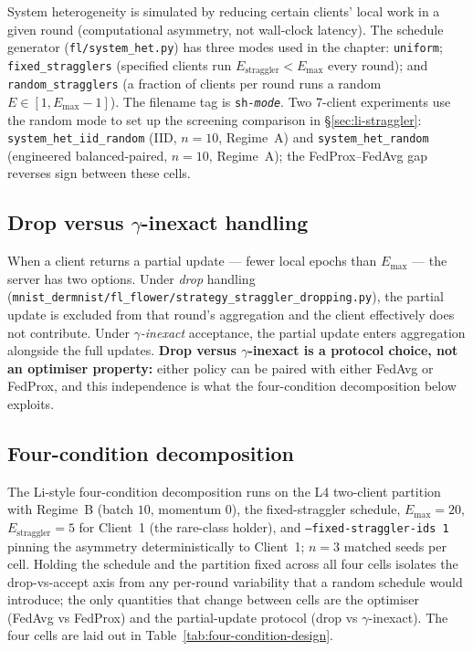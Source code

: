 \documentclass[11pt,a4paper]{report}
\begin{document}
System heterogeneity is simulated by reducing certain clients' local
work in a given round (computational asymmetry, not wall-clock
latency). The schedule generator (\texttt{fl/system\_het.py}) has three
modes used in the chapter: \texttt{uniform}; \texttt{fixed\_stragglers}
(specified clients run $E_{\textrm{straggler}} < E_{\max}$ every
round); and \texttt{random\_stragglers} (a fraction of clients per
round runs a random $E \in [1, E_{\max}-1]$). The filename tag is
\texttt{sh-\textit{mode}}. Two 7-client experiments use the random
mode to set up the screening comparison in §\ref{sec:li-straggler}:
\texttt{system\_het\_iid\_random} (IID, $n = 10$, Regime~A) and
\texttt{system\_het\_random} (engineered balanced-paired, $n = 10$,
Regime~A); the FedProx--FedAvg gap reverses sign between these cells.

\subsection{Drop versus $\gamma$-inexact handling}

When a client returns a partial update --- fewer local epochs than
$E_{\max}$ --- the server has two options. Under \emph{drop} handling
(\texttt{mnist\_dermnist/fl\_flower/strategy\_straggler\_dropping.py}),
the partial update is excluded from that round's aggregation and the
client effectively does not contribute. Under \emph{$\gamma$-inexact}
acceptance, the partial update enters aggregation alongside the full
updates. \textbf{Drop versus $\gamma$-inexact is a protocol choice, not
an optimiser property:} either policy can be paired with either FedAvg
or FedProx, and this independence is what the four-condition
decomposition below exploits.

\subsection{Four-condition decomposition}

The Li-style four-condition decomposition runs on the L4 two-client
partition with Regime~B (batch $10$, momentum $0$), the fixed-straggler
schedule, $E_{\max} = 20$, $E_{\textrm{straggler}} = 5$ for Client~1
(the rare-class holder), and \texttt{--fixed-straggler-ids 1} pinning
the asymmetry deterministically to Client~1; $n = 3$ matched seeds per
cell. Holding the schedule and the partition fixed across all four
cells isolates the drop-vs-accept axis from any per-round variability
that a random schedule would introduce; the only quantities that change
between cells are the optimiser (FedAvg vs FedProx) and the
partial-update protocol (drop vs $\gamma$-inexact). The four cells are
laid out in Table~\ref{tab:four-condition-design}.
\end{document}
